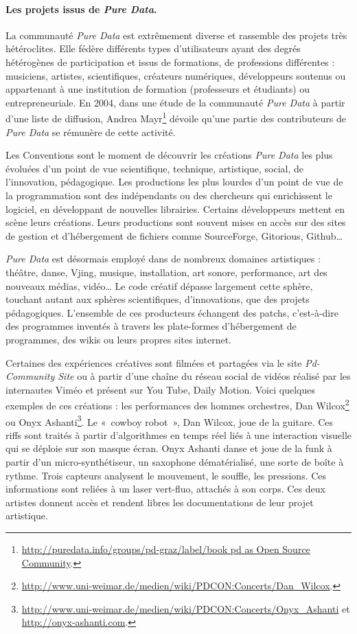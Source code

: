\documentclass{FramateX}
\begin{document}
\begin{refsection}
\paragraph{Les projets issus de \textit{Pure Data}.}
La communauté \textit{Pure Data} est extrêmement diverse et rassemble des projets
très hétéroclites. Elle fédère différents types d'utilisateurs ayant
des degrés hétérogènes de participation et issus de formations, de
professions différentes : musiciens, artistes, scientifiques, créateurs
numériques, développeurs soutenus ou appartenant à une institution de
formation (professeurs et étudiants) ou entrepreneuriale. En 2004, dans
une étude de la communauté \textit{Pure Data} à partir d'une liste de diffusion,
Andrea Mayr\footnote{\url{http://puredata.info/groups/pd-graz/label/book
pd as Open Source Community}.} dévoile qu'une partie des contributeurs de
\textit{Pure Data} se rémunère de cette activité. 

Les Conventions sont le moment de découvrir les créations \textit{Pure Data} les
plus évoluées d'un point de vue scientifique, technique, artistique,
social, de l'innovation, pédagogique. Les productions les plus lourdes
d'un point de vue de la programmation sont des indépendants ou des
chercheurs qui enrichissent le logiciel, en développant de nouvelles
librairies. Certains développeurs mettent en scène leurs créations.
Leurs productions sont souvent mises en accès sur des sites de gestion
et d'hébergement de fichiers comme SourceForge, Gitorious, Github… 

\textit{Pure Data} est désormais employé dans de nombreux domaines artistiques :
théâtre, danse, Vjing, musique, installation, art sonore, performance,
art des nouveaux médias, vidéo… Le code créatif dépasse largement cette
sphère, touchant autant aux sphères scientifiques, d'innovations, que
des projets pédagogiques. L'ensemble de ces producteurs échangent des
patchs, c'est-à-dire des programmes inventés à travers les plate-formes
d'hébergement de programmes, des wikis ou leurs propres sites internet.


Certaines des expériences créatives sont filmées et partagées via le
site \textit{Pd-Community Site} ou à partir d'une chaîne du réseau social de
vidéos réalisé par les internautes Viméo et présent sur You Tube, Daily
Motion. Voici quelques exemples de ces créations : les performances des
hommes orchestres, Dan
Wilcox\footnote{\url{http://www.uni-weimar.de/medien/wiki/PDCON:Concerts/Dan\_Wilcox}.}
ou Onyx Ashanti\footnote{\url{http://www.uni-weimar.de/medien/wiki/PDCON:Concerts/Onyx\_Ashanti} et \url{http://onyx-ashanti.com}.}. Le «~cowboy robot~», Dan Wilcox, joue de la
guitare. Ces riffs sont traités à partir d'algorithmes en temps réel
liés à une interaction visuelle qui se déploie sur son masque écran.
Onyx Ashanti danse et joue de la funk à partir d'un micro-synthétiseur,
un saxophone dématérialisé, une sorte de boîte à rythme. Trois capteurs
analysent le mouvement, le souffle, les pressions. Ces informations
sont reliées à un laser vert-fluo, attachés à son corps. Ces deux
artistes donnent accès et rendent libres les documentations de leur
projet artistique. 


\end{refsection}
\end{document}
